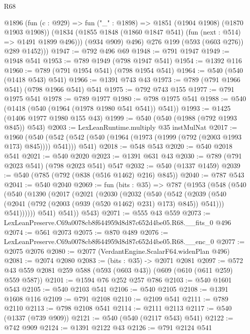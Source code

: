 \begin{lexlean}{R68}
\begin{coremodule}
          @1896
            (fun (c : @929) => fun ("_" : @1898) => @1851 (@1904 @1908) (@1870 @1903 @1908))
            (@1834 (@1855 @1848 (@1860 @1847 @541) (fun (next : @514) => @1491 @1899 @496)))
            (@934 @909)
            @496)
          @276
          @199
          (@593 (@603 @276))
          @289
          @1452)))
@1947 := @792 @496 @69
@1948 := @791 @1947
@1949 := @1948 @541
@1953 := @789 @1949 (@798 @1947 @541)
@1954 := @1392 @116
@1960 := @789 (@791 @1954 @541) (@798 @1954 @541)
@1964 := @540 (@540 (@1418 @543) @541)
@1966 := @1391 @743 @43
@1973 := @789 (@791 @1966 @541) (@798 @1966 @541) @541
@1975 := @792 @743 @155
@1977 := @791 @1975 @541
@1978 := @789 @1977
@1980 := @798 @1975 @541
@1988 := @540 (@1418 (@540 (@1964 (@1978 @1980 @541 @541)) @541))
@1993 := @1425 (@1406 @1977 @1980 @155 @43)
@1999 := @540 (@540 (@1988 (@792 @1993 @845)) @543)
@2003 := LexLeanRuntime.multiply @35 instMulNat
@2017 := @1960
    (@540 (@542 (@542 (@540 (@1964 (@1973 (@1999 (@792 (@2003 @1993 @173) @845)))) @541))) @541)
@2018 := @548 @543
@2020 := @540 @2018 @541
@2021 := @540 @2020
@2023 := @1391 @631 @43
@2030 := @789 (@791 @2023 @541) (@798 @2023 @541) @547
@2032 := @540 (@1337 @1459)
@2039 := @540 (@785 (@792 (@838 (@516 @1462) @216) @845))
@2040 := @787 @543
@2041 := @540 @2040
@2069 := fun (bits : @35) =>
  @787
    (@1953
      (@548
        (@540
          (@540
            (@1390
              (@2017
                (@2021
                  (@2030
                    (@2032
                      (@540
                        (@542
                          (@2039
                            (@540 (@2041 (@792 (@2003 (@939 (@520 @1462) @231) @173) @845)) @541)))
                        @541))))))
            @541)
          @541))
      @543)
@2071 := @555 @43 @559
@2073 := LexLeanPreserve.C69a0078cb8f644959d8d87c652d4be05.R68.__fits_0 @496
@2074 := @561 @2073
@2075 := @870 @489
@2076 := LexLeanPreserve.C69a0078cb8f644959d8d87c652d4be05.R68.__enc_0
@2077 := @2075 @2076
@2080 := @2077 (VerdantEngine.ScalarF64.widenPlan @496)
@2081 := @2074 @2080
@2083 := (bits : @35) -> @2071 @2081
@2097 := @572 @43 @559 @2081 @259 @588 (@593 (@603 @43)) (@609 (@610 (@611 @259) @559 @587))
@2101 := @1594 @76 @252 @257 @786
@2103 := @540 @1601 @543
@2105 := @540 @2103 @541
@2106 := @540 @2105
@2108 := @1391 @1608 @116
@2109 := @791 @2108
@2110 := @2109 @541
@2111 := @789 @2110
@2113 := @798 @2108 @541
@2114 := @2111 @2113
@2117 := @540 (@1337 (@739 @909))
@2121 := @540 (@540 (@2117 @543) @541)
@2122 := @742 @909
@2124 := @1391 @2122 @43
@2126 := @791 @2124 @541

\end{coremodule}
\end{lexlean}
